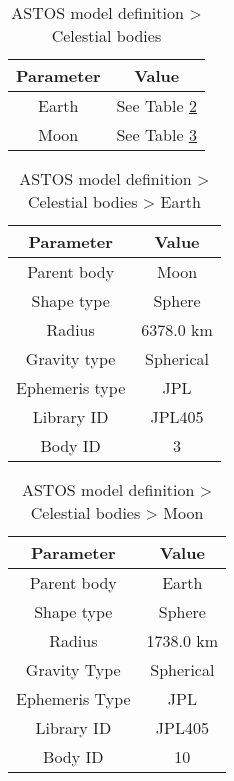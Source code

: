 \begin{table}
\caption{ASTOS model definition > Celestial bodies}
\label{tab: ASTOS-model-definition>celestial-bodies}
\begin{center}
\begin{tabular}{|cc|}
\hline
Parameter & Value\\
\hline
\hline
Earth & See Table \ref{tab: ASTOS-model-definition>celestial-bodies>earth}\\
Moon & See Table \ref{tab: ASTOS-model-definition>celestial-bodies>moon}\\
\hline
\end{tabular}
\end{center}
\end{table}

\begin{table}
\caption{ASTOS model definition > Celestial bodies > Earth}
\label{tab: ASTOS-model-definition>celestial-bodies>earth}
\begin{center}
\begin{tabular}{|cc|}
\hline
Parameter & Value\\
\hline
\hline
Parent body & Moon\\
Shape type & Sphere\\
Radius & 6378.0 km\\
Gravity type & Spherical\\
Ephemeris type & JPL \\
Library ID & JPL405 \\
Body ID & 3\\
\hline
\end{tabular}
\end{center}
\end{table}

\begin{table}
\caption{ASTOS model definition > Celestial bodies > Moon}
\label{tab: ASTOS-model-definition>celestial-bodies>moon}
\begin{center}
\begin{tabular}{|cc|}
\hline
Parameter & Value\\
\hline
\hline
Parent body & Earth\\
Shape type & Sphere\\
Radius & 1738.0 km\\
Gravity Type & Spherical\\
Ephemeris Type & JPL\\
Library ID & JPL405\\
Body ID & 10\\
\hline
\end{tabular}
\end{center}
\end{table}

